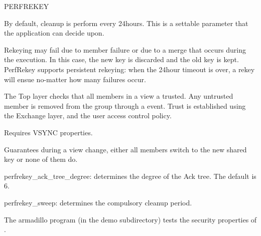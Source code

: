 \begin{Layer}{PERFREKEY}
\begin{Protocol}
By default, cleanup is perform every 24hours. This is a settable
parameter that the application can decide upon. 

Rekeying may fail due to member failure or due to a merge that
occurs during the execution. In this case, the new key is discarded
and the old key is kept. PerfRekey supports persistent rekeying: when
the 24hour timeout is over, a rekey will ensue no-matter how many
failures occur. 

The Top layer checks that all members in a view a trusted. Any
untrusted member is removed from the group through a 
event. Trust is established using the Exchange layer, and the user
access control policy.
\end{Protocol}

\begin{Properties}
\item Requires VSYNC properties.
\item
Guarantees during a view change, either all members switch to the new
shared key or none of them do.
\end{Properties}

\begin{Parameters}
\item {perfrekey\_ack\_tree\_degree:} determines the degree of the Ack
tree. The default is 6.
\item {perfrekey\_sweep:} determines the compulsory cleanup period. 
\end{Parameters}

\begin{Sources}
\end{Sources}

\begin{GenEvent}
\end{GenEvent}

\begin{Testing}
\item 
The armadillo program (in the demo subdirectory) tests the security properties
of \ensemble.
\end{Testing}

\end{Layer}



